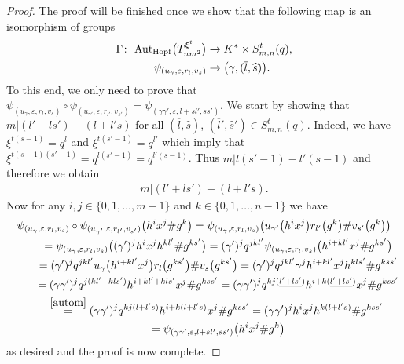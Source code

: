 \documentclass[10pt,a4paper]{amsart}
\numberwithin{equation}{section}
\begin{document}
\begin{proof}
The proof will be finished once we show that the following map is an isomorphism of groups
\begin{align*}
\Gamma\colon \ {\rm Aut} _{\rm Hopf}\big(T_{nm^{2}}^ {\xi^{t}}\big) & \to K^{*}\times S^{t}_{m, n}(q), \\
 \psi_{(u_{\gamma}, \varepsilon, r_{l}, v_{s})} & \to \big(\gamma, (\overline{l}, \widehat{s})\big).
\end{align*}
To this end, we only need to prove that $\psi_{(u_{\gamma}, \varepsilon, r_{l}, v_{s})} \circ \psi_{(u_{\gamma '}, \varepsilon, r_{l'}, v_{s'})} = \psi_{(\gamma \gamma ', \varepsilon, l + sl' , ss')}$. We start by showing that $m | (l' + ls') - (l + l's)$ for all $(\overline{l}, \widehat{s})$, $(\overline{l}', \widehat{s}') \in S^{t}_{m, n}(q)$. Indeed, we have $\xi^{t(s-1)} = q^{l}$ and $\xi^{t(s'-1)} = q^{l'}$ which imply that $\xi^{t(s-1)(s'-1)} = q^{l(s'-1)} = q^{l'(s-1)}$. Thus $m | l(s'-1) - l'(s-1)$ and therefore we obtain
\begin{gather}\label{autom}
m | (l' + ls') - (l + l's).
\end{gather}
Now for any $i, j \in \{0, 1,\dots, m-1\}$ and $k \in \{0, 1,\dots, n-1\}$ we have
\begin{gather*}
\psi_{(u_{\gamma}, \varepsilon, r_{l}, v_{s})} \circ \psi_{(u_{\gamma '}, \varepsilon, r_{l'}, v_{s'})}\big(h^{i}
x^{j} \# g^{k}\big) = \psi_{(u_{\gamma}, \varepsilon, r_{l}, v_{s})}\big(u_{\gamma '}\big(h^{i}
x^{j}\big) r_{l'}\big(g^{k}\big) \# v_{s'}\big(g^{k}\big) \big) \\
\qquad \ {} =\psi_{(u_{\gamma}, \varepsilon, r_{l}, v_{s})}\big((\gamma')^{j} h^{i} x^{j}
h^{kl'} \# g^{ks'}\big) = (\gamma')^{j} q^{jkl'} \psi_{(u_{\gamma}, \varepsilon, r_{l}, v_{s})}
\big(h^{i+kl'} x^{j} \# g^{ks'}\big) \\
\qquad \ {} = (\gamma')^{j} q^{jkl'} u_{\gamma}\big(h^{i+kl'} x^{j}\big) r_{l}\big(g^{ks'}\big)
 \# v_{s}\big(g^{ks'}\big) =(\gamma')^{j} q^{jkl'} \gamma^{j} h^{i+kl'} x^{j} h^{kls'} \# g^{kss'} \nonumber\\
\qquad \ {} =(\gamma \gamma')^{j} q^{j(kl' + kls')} h^{i + kl' + kls'} x^{j} \# g^{kss'}
 =(\gamma \gamma')^{j} q^{kj(\underline{l' + ls'})} h^{i + k(\underline{l' + ls'})} x^{j} \# g^{kss'} \\
 \qquad {} \stackrel{\eqref{autom}} {=} (\gamma \gamma')^{j} q^{kj(l +
l's)} h^{i + k(l + l's)} x^{j} \# g^{kss'}
 = (\gamma \gamma')^{j} h^{i} x^{j} h^{k(l + l's)} \# g^{kss'} \\
 \qquad \ {} = \psi_{(\gamma \gamma ', \varepsilon, l + sl', ss')}\big(h^{i} x^{j} \# g^{k}\big)
\end{gather*}
as desired and the proof is now complete.
\end{proof}
\end{document}
